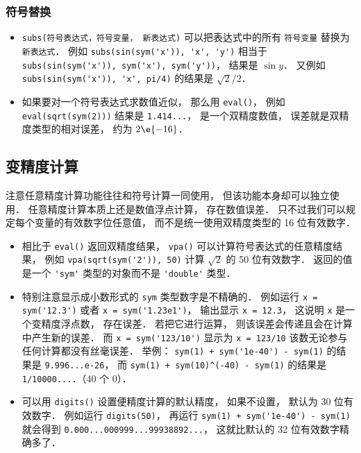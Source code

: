 \subsubsection{符号替换}
\begin{itemize}
\item \verb|subs(符号表达式，符号变量， 新表达式)| 可以把表达式中的所有 \verb|符号变量| 替换为 \verb|新表达式|． 例如 \verb|subs(sin(sym('x')), 'x', 'y')| 相当于 \verb|subs(sin(sym('x')), sym('x'), sym('y'))|， 结果是 $\sin y$． 又例如 \verb|subs(sin(sym('x')), 'x', pi/4)| 的结果是 $\sqrt 2/2$．
\item 如果要对一个符号表达式求数值近似， 那么用 \verb|eval()|， 例如 \verb|eval(sqrt(sym(2)))| 结果是 \verb|1.414...|， 是一个双精度数值， 误差就是双精度类型的相对误差， 约为 $2\e{-16}$．
\end{itemize}

\subsection{变精度计算}
注意任意精度计算功能往往和符号计算一同使用， 但该功能本身却可以独立使用． 任意精度计算本质上还是数值浮点计算， 存在数值误差． 只不过我们可以规定每个变量的有效数字位任意值， 而不是统一使用双精度类型的 16 位有效数字．

\begin{itemize}
\item 相比于 \verb|eval()| 返回双精度结果， \verb|vpa()| 可以计算符号表达式的任意精度结果， 例如 \verb|vpa(sqrt(sym('2')), 50)| 计算 $\sqrt{2}$ 的 50 位有效数字． 返回的值是一个 \verb|'sym'| 类型的对象而不是 \verb|'double'| 类型．
\item  特别注意显示成小数形式的 \verb|sym| 类型数字是不精确的． 例如运行 \verb|x = sym('12.3')| 或者 \verb|x = sym('1.23e1')|， 输出显示 \verb|x = 12.3|， 这说明 \verb|x| 是一个变精度浮点数， 存在误差． 若把它进行运算， 则该误差会传递且会在计算中产生新的误差． 而 \verb|x = sym('123/10')| 显示为 \verb|x = 123/10| 该数无论参与任何计算都没有丝毫误差． 举例： \verb|sym(1) + sym('1e-40') - sym(1)| 的结果是 \verb|9.996...e-26|， 而 \verb|sym(1) + sym(10)^(-40) - sym(1)| 的结果是 \verb|1/10000....|（40 个 0）．
\item 可以用 \verb|digits()| 设置便精度计算的默认精度， 如果不设置， 默认为 30 位有效数字． 例如运行 \verb|digits(50)|， 再运行 \verb|sym(1) + sym('1e-40') - sym(1)| 就会得到 \verb|0.000...000999...99938892...|， 这就比默认的 32 位有效数字精确多了．
\end{itemize}
